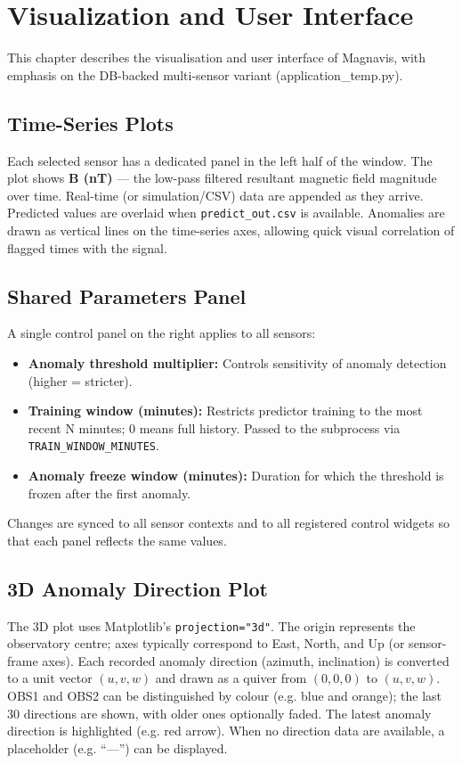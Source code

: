 \chapter{Visualization and User Interface}
\label{Chapter6}

This chapter describes the visualisation and user interface of Magnavis, with emphasis on the DB-backed multi-sensor variant (application\_temp.py).

\section{Time-Series Plots}
Each selected sensor has a dedicated panel in the left half of the window. The plot shows \textbf{B (nT)} --- the low-pass filtered resultant magnetic field magnitude over time. Real-time (or simulation/CSV) data are appended as they arrive. Predicted values are overlaid when \texttt{predict\_out.csv} is available. Anomalies are drawn as vertical lines on the time-series axes, allowing quick visual correlation of flagged times with the signal.

\section{Shared Parameters Panel}
A single control panel on the right applies to all sensors:
\begin{itemize}
    \item \textbf{Anomaly threshold multiplier:} Controls sensitivity of anomaly detection (higher = stricter).
    \item \textbf{Training window (minutes):} Restricts predictor training to the most recent N minutes; 0 means full history. Passed to the subprocess via \texttt{TRAIN\_WINDOW\_MINUTES}.
    \item \textbf{Anomaly freeze window (minutes):} Duration for which the threshold is frozen after the first anomaly.
\end{itemize}
Changes are synced to all sensor contexts and to all registered control widgets so that each panel reflects the same values.

\section{3D Anomaly Direction Plot}
The 3D plot uses Matplotlib's \texttt{projection="3d"}. The origin represents the observatory centre; axes typically correspond to East, North, and Up (or sensor-frame axes). Each recorded anomaly direction (azimuth, inclination) is converted to a unit vector $(u, v, w)$ and drawn as a quiver from $(0,0,0)$ to $(u,v,w)$. OBS1 and OBS2 can be distinguished by colour (e.g. blue and orange); the last 30 directions are shown, with older ones optionally faded. The latest anomaly direction is highlighted (e.g. red arrow). When no direction data are available, a placeholder (e.g. ``---'') can be displayed.

